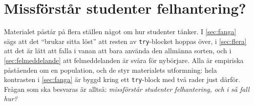 
\chapter{Missförstår studenter felhantering?}
\label{app:nyborjare}

Materialet påstår på flera ställen något om hur studenter tänker.  I
\cref{sec:fanga} sägs att det \enquote{brukar sitta löst} att resten av
\texttt{try}-blocket hoppas över, i \cref{sec:flera} att
det är lätt att falla i vanan att bara använda den allmänna sorten, och
i \cref{sec:felmeddelande} att felmeddelanden är svåra för nybörjare.
Alla är empiriska påståenden om en population, och de styr materialets
utformning: hela kontrasten i \cref{sec:fanga} är byggd kring ett
\texttt{try}-block med två rader just därför.  Frågan som ska
besvaras är alltså: \emph{missförstår studenter felhantering, och i så
fall hur?}

